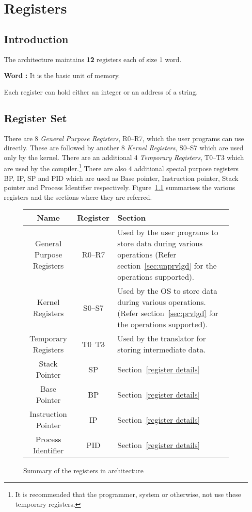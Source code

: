 \chapter{Registers}
\label{chp:registers}

\section{Introduction}
The \ESIM architecture maintains \textbf{12} registers each of size 1 word.
\begin{defn}
	\textbf{Word :} It is the  basic unit of memory. 
\end{defn}
Each register can hold either an integer or an address of a string.

\section{Register Set}
There are 8 \emph{General Purpose Registers}, R0--R7, which the user programs can use directly. These are followed by another 8 \emph{Kernel Registers}, S0--S7 which are used only by the kernel. There are an additional 4 \emph{Temporary Registers}, T0--T3 which are used by the compiler.\footnote{It is recommended that the programmer, system or otherwise, not use these temporary registers.} There are also 4 additional special purpose registers BP, IP, SP and PID which are used as Base pointer, Instruction pointer, Stack pointer and Process Identifier respectively.
Figure~\ref{tbl:registers} summarises the various registers and the sections where they are referred. 
\begin{figure}[h!]
	\centering
	\begin{tabular}{|c|c|m{5cm}|}
		\toprule
		\textbf{Name} & \textbf{Register} & \textbf{Section} \\
		\toprule
		General Purpose Registers & R0--R7 & Used by the user programs to store data during various operations (Refer section~\ref{sec:unprvlgd} for the operations supported). \\
		\hline
		Kernel Registers & S0--S7  & Used by the OS to store data during various operations.(Refer section~\ref{sec:prvlgd} for the operations supported). \\
		\hline
		Temporary Registers & T0--T3 & Used by the translator for storing intermediate data. \\
		\hline
		Stack Pointer & SP & Section~\ref{register details} \\ 
		\hline
		Base Pointer & BP & Section~\ref{register details} \\ 
		\hline
		Instruction Pointer & IP & Section~\ref{register details} \\ 
		\hline
		Process Identifier & PID & Section~\ref{register details} \\
		\bottomrule
	\end{tabular}
	\caption{Summary of the registers in \ESIM architecture}
	\label{tbl:registers}
\end{figure}